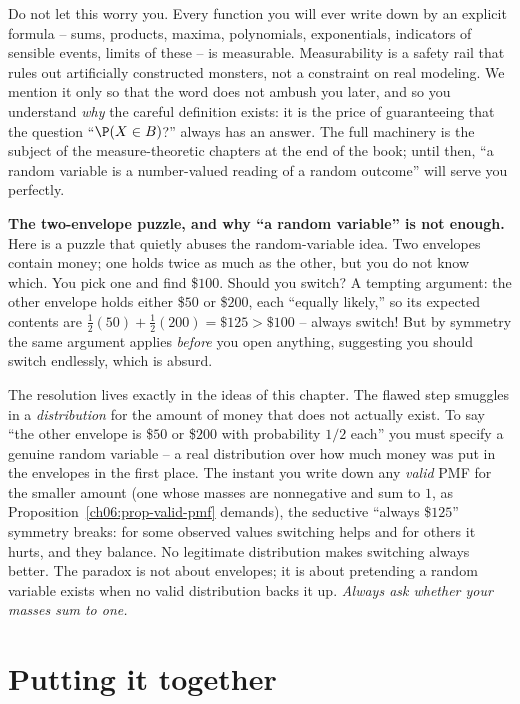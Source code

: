 Do not let this worry you. Every function you will ever write down by an explicit
formula -- sums, products, maxima, polynomials, exponentials, indicators of sensible
events, limits of these -- is measurable. Measurability is a safety rail that rules out
artificially constructed monsters, not a constraint on real modeling. We mention it
only so that the word does not ambush you later, and so you understand \emph{why} the
careful definition exists: it is the price of guaranteeing that the question
``$\P(X \in B)$?'' always has an answer. The full machinery is the subject of the
measure-theoretic chapters at the end of the book; until then, ``a random variable is a
number-valued reading of a random outcome'' will serve you perfectly.

\begin{paradoxbox}
\textbf{The two-envelope puzzle, and why ``a random variable'' is not enough.}
Here is a puzzle that quietly abuses the random-variable idea. Two envelopes contain
money; one holds twice as much as the other, but you do not know which. You pick one
and find \$$100$. Should you switch? A tempting argument: the other envelope holds
either \$$50$ or \$$200$, each ``equally likely,'' so its expected contents are
$\tfrac12(50) + \tfrac12(200) = \$125 > \$100$ -- always switch! But by symmetry the
same argument applies \emph{before} you open anything, suggesting you should switch
endlessly, which is absurd.

The resolution lives exactly in the ideas of this chapter. The flawed step smuggles in
a \emph{distribution} for the amount of money that does not actually exist. To say ``the
other envelope is \$$50$ or \$$200$ with probability $1/2$ each'' you must specify a
genuine random variable -- a real distribution over how much money was put in the
envelopes in the first place. The instant you write down any \emph{valid} PMF for the
smaller amount (one whose masses are nonnegative and sum to $1$, as
Proposition~\ref{ch06:prop-valid-pmf} demands), the seductive ``always \$$125$''
symmetry breaks: for some observed values switching helps and for others it hurts, and
they balance. No legitimate distribution makes switching always better. The paradox is
not about envelopes; it is about pretending a random variable exists when no valid
distribution backs it up. \emph{Always ask whether your masses sum to one.}
\end{paradoxbox}

\section{Putting it together}
\label{ch06:synthesis}

